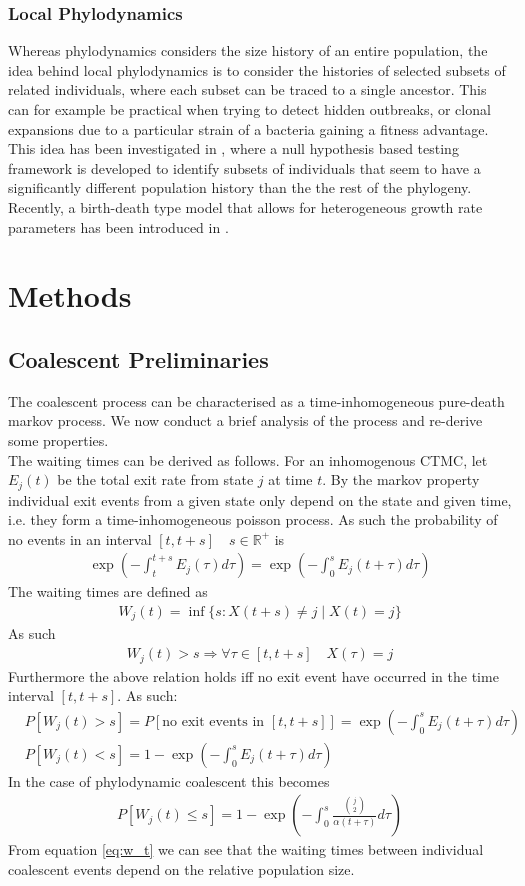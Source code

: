 \documentclass{report}
\newcommand{\R}{\mathbb{R}}
\theoremstyle{definition}
\begin{document}
\subsection{Local Phylodynamics}
Whereas phylodynamics considers the size history of an entire population, the idea behind local phylodynamics is to consider the histories of selected subsets of related individuals, where each subset can be traced to a single ancestor. This can for example be practical when trying to detect hidden outbreaks, or clonal expansions due to a particular strain of a bacteria gaining a fitness advantage. This idea has been investigated in \cite{volz_identification_nodate}, where a null hypothesis based testing framework is developed to identify subsets of individuals that seem to have a significantly different population history than the the rest of the phylogeny. Recently, a birth-death type model that allows for heterogeneous growth rate parameters has been introduced in \cite{barido-sottani_multitype_2020}.
\chapter{Methods}
\section{Coalescent Preliminaries}
The coalescent process can be characterised as a time-inhomogeneous pure-death markov process. We now conduct a brief analysis of the process and re-derive some properties.\\
The waiting times can be derived as follows.
For an inhomogenous CTMC, let $E_j(t)$ be the total exit rate from state $j$ at time $t$.
By the markov property individual exit events from a given state only depend on the state and given time, i.e. they form a time-inhomogeneous poisson process.
As such the probability of no events in an interval $[t,t+s]\quad s\in \R^+$ is 
\begin{gather}
\exp(-\int_t^{t+s}E_j(\tau)d\tau) = \exp(-\int_0^{s}E_j(t+\tau)d\tau)
\end{gather}
The waiting times are defined as
\begin{gather}
W_j(t) = \inf\{s:X(t+s)\neq j \mid X(t) = j\}
\end{gather}
As such
\begin{gather}
W_j(t) > s \Rightarrow \forall \tau\in[t, t+s]\quad X(\tau) = j
\end{gather}
Furthermore the above relation holds iff no exit event have occurred in the time interval $[t,t+s]$. As such:
\begin{align*}
&P[W_j(t) > s] = P[\text{no exit events in }[t,t+s]] = \exp(-\int_0^{s}E_j(t+\tau)d\tau)\\
&P[W_j(t) < s] = 1 - \exp(-\int_0^{s}E_j(t+\tau)d\tau)
\end{align*}
In the case of phylodynamic coalescent this becomes
\begin{gather}\label{eq:w_t}
P[W_j(t) \leq s] = 1 - \exp(-\int_0^{s}\frac{\binom{j}{2}}{\alpha(t+\tau)}d\tau)
\end{gather}
From equation \ref{eq:w_t} we can see that the waiting times between individual coalescent events depend on the relative population size.
\end{document}
